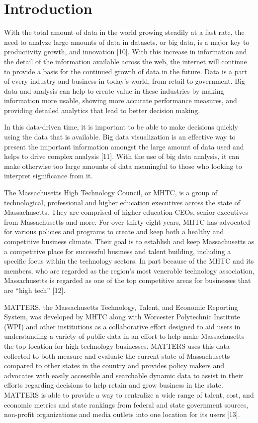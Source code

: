 \chapter{Introduction}

	With the total amount of data in the world growing steadily at a fast rate, 
	the need to analyze large amounts of data in datasets, or big data, is a major 
	key to productivity growth, and innovation [10]. With this increase in 
	information and the detail of the information available across the web, 
	the internet will continue to provide a basis for the continued growth of 
	data in the future. Data is a part of every industry and business in today’s 
	world, from retail to government. Big data and analysis can help to create
	 value in these industries by making information more usable, showing more 
	 accurate performance measures, and providing detailed analytics that 
	 lead to better decision making.

	In this data-driven time, it is important to be able to make decisions 
	quickly using the data that is available. Big data visualization is an 
	effective way to present the important information amongst the large amount 
	of data used and helps to drive complex analysis [11]. With the use of big 
	data analysis, it can make otherwise too large amounts of data meaningful 
	to those who looking to interpret significance from it.

	The Massachusetts High Technology Council, or MHTC, is a group of technological, 
	professional and higher education executives across the state of Massachusetts. 
	They are comprised of higher education CEOs, senior executives from Massachusetts 
	and more. For over thirty-eight years, MHTC has advocated for various policies 
	and programs to create and keep both a healthy and competitive business climate. 
	Their goal is to establish and keep Massachusetts as a competitive place for 
	successful business and talent building, including a specific focus within the 
	technology sectors. In part because of the MHTC and its members, who are 
	regarded as the region’s most venerable technology association, Massachusetts 
	is regarded as one of the top competitive areas for businesses that are “high tech” [12].

	MATTERS, the Massachusetts Technology, Talent, and Economic Reporting System, 
	was developed by MHTC along with Worcester Polytechnic Institute (WPI) and other 
	institutions as a collaborative effort designed to aid users in understanding a 
	variety of public data in an effort to help make Massachusetts the top location 
	for high technology businesses. MATTERS uses this data collected to both measure 
	and evaluate the current state of Massachusetts compared to other states in the 
	country and provides policy makers and advocates with easily accessible and searchable 
	dynamic data to assist in their efforts regarding decisions to help  retain and 
	grow business in the state. MATTERS is able to provide a way to centralize a wide 
	range of talent, cost, and economic metrics and state rankings from federal and 
	state government sources, non-profit organizations and media outlets into one 
	location for its users [13]. 

